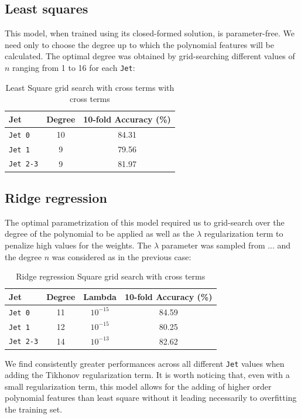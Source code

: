 \documentclass[10pt,conference,compsocconf]{IEEEtran}
\begin{document}
\subsection{Least squares}
This model, when trained using its closed-formed solution, is parameter-free. We need only to choose the degree  up to which the polynomial features will be calculated. The optimal degree was obtained by grid-searching different values of $n$ ranging from 1 to 16 for each \verb+Jet+: 
\begin{table}[h!]
\centering
\caption{Least Square grid search with cross terms with cross terms }
\footnotesize
\begin{tabular}{|l| c|c| } 
 \hline
   Jet & Degree & 10-fold Accuracy (\%)  \\
 \hline
   \verb+Jet 0+  & 10 &  84.31 \\
   \verb+Jet 1+  & 9 & 79.56 \\
   \verb+Jet 2-3+  & 9 & 81.97\\
  \hline
\end{tabular}
\label{grid_search_ridge_cross}
\end{table}
\subsection{Ridge regression}
The optimal parametrization of this model required us to grid-search over the degree of the polynomial to be applied as well as the $\lambda$ regularization term to penalize high values for the weights. The $\lambda$ parameter was sampled from ... and the degree $n$ was considered as in the previous case: 

\begin{table}[h!]
\centering
\caption{Ridge regression Square grid search  with cross terms}
\footnotesize
\begin{tabular}{|l| cc|c| } 
 \hline
   Jet & Degree & Lambda & 10-fold Accuracy (\%)  \\
 \hline
   \verb+Jet 0+  & 11 & $10^{-15}$  & 84.59  \\
   \verb+Jet 1+  & 12 & $10^{-15}$  & 80.25 \\
   \verb+Jet 2-3+  & 14  &  $10^{-13}$ & 82.62 \\
  \hline
  \end{tabular}
\label{grid_search_ridge_cross}
\end{table}

We find consistently greater performances across all different \verb+Jet+ values when adding the Tikhonov regularization term. It is worth noticing that, even with a small regularization term, this model allows for the adding of higher order polynomial features than least square without it leading necessarily to overfitting the training set. 
\end{document}
